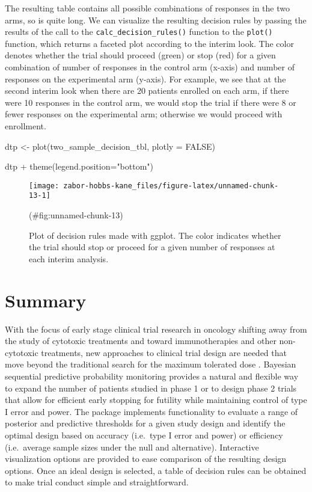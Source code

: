 The resulting table contains all possible combinations of responses in
the two arms, so is quite long. We can visualize the resulting decision
rules by passing the results of the call to the
\texttt{calc\_decision\_rules()} function to the \texttt{plot()}
function, which returns a faceted plot according to the interim look.
The color denotes whether the trial should proceed (green) or stop (red)
for a given combination of number of responses in the control arm
(x-axis) and number of responses on the experimental arm (y-axis). For
example, we see that at the second interim look when there are 20
patients enrolled on each arm, if there were 10 responses in the control
arm, we would stop the trial if there were 8 or fewer responses on the
experimental arm; otherwise we would proceed with enrollment.

\begin{Schunk}
\begin{Sinput}
dtp <- plot(two_sample_decision_tbl, plotly = FALSE)

dtp + 
  theme(legend.position="bottom")
\end{Sinput}
\begin{figure}
\texttt{[image: zabor-hobbs-kane\_files/figure-latex/unnamed-chunk-13-1]} \caption[Plot of decision rules made with ggplot]{Plot of decision rules made with ggplot. The color indicates whether the trial should stop or proceed for a given number of responses at each interim analysis.}(\#fig:unnamed-chunk-13)
\end{figure}
\end{Schunk}

\hypertarget{summary}{%
\section{Summary}\label{summary}}

With the focus of early stage clinical trial research in oncology
shifting away from the study of cytotoxic treatments and toward
immunotherapies and other non-cytotoxic treatments, new approaches to
clinical trial design are needed that move beyond the traditional search
for the maximum tolerated dose \citep{Hobbs2019}. Bayesian sequential
predictive probability monitoring provides a natural and flexible way to
expand the number of patients studied in phase 1 or to design phase 2
trials that allow for efficient early stopping for futility while
maintaining control of type I error and power. The 
package implements functionality to evaluate a range of posterior and
predictive thresholds for a given study design and identify the optimal
design based on accuracy (i.e.~type I error and power) or efficiency
(i.e.~average sample sizes under the null and alternative). Interactive
visualization options are provided to ease comparison of the resulting
design options. Once an ideal design is selected, a table of decision
rules can be obtained to make trial conduct simple and straightforward.

